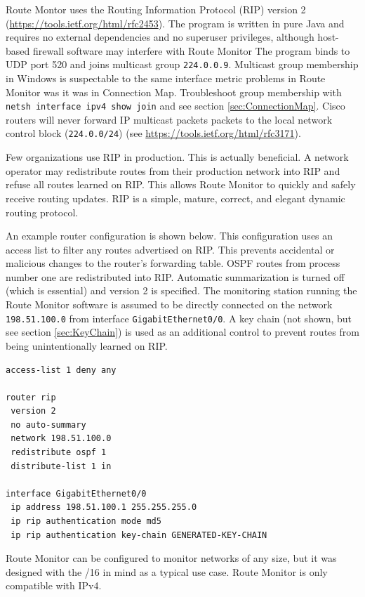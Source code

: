 \documentclass[12pt]{article}
\begin{document}
Route Montor uses the Routing Information Protocol (RIP) version 2 (\url{https://tools.ietf.org/html/rfc2453}).
The program is written in pure Java and requires no external dependencies and no superuser privileges, although host-based firewall software may interfere with Route Monitor
The program binds to UDP port 520 and joins multicast group \texttt{224.0.0.9}.
Multicast group membership in Windows is suspectable to the same interface metric problems in Route Monitor was it was in Connection Map.
Troubleshoot group membership with \texttt{netsh interface ipv4 show join} and see section \ref{sec:ConnectionMap}.
Cisco routers will never forward IP multicast packets packets to the local network control block (\texttt{224.0.0/24}) (see \url{https://tools.ietf.org/html/rfc3171}).

Few organizations use RIP in production.
This is actually beneficial.
A network operator may redistribute routes from their production network into RIP and refuse all routes learned on RIP.
This allows Route Monitor to quickly and safely receive routing updates.
RIP is a simple, mature, correct, and elegant dynamic routing protocol.

An example router configuration is shown below.
This configuration uses an access list to filter any routes advertised on RIP.
This prevents accidental or malicious changes to the router's forwarding table.
OSPF routes from process number one are redistributed into RIP.
Automatic summarization is turned off (which is essential) and version 2 is specified.
The monitoring station running the Route Monitor software is assumed to be directly connected on the network \texttt{198.51.100.0} from interface \texttt{GigabitEthernet0/0}.
A key chain (not shown, but see section \ref{sec:KeyChain}) is used as an additional control to prevent routes from being unintentionally learned on RIP.

\begin{lstlisting}
access-list 1 deny any

router rip
 version 2
 no auto-summary
 network 198.51.100.0
 redistribute ospf 1
 distribute-list 1 in
 
interface GigabitEthernet0/0
 ip address 198.51.100.1 255.255.255.0
 ip rip authentication mode md5
 ip rip authentication key-chain GENERATED-KEY-CHAIN
\end{lstlisting}

Route Monitor can be configured to monitor networks of any size, but it was designed with the /16 in mind as a typical use case. Route Monitor is only compatible with IPv4.
\end{document}
